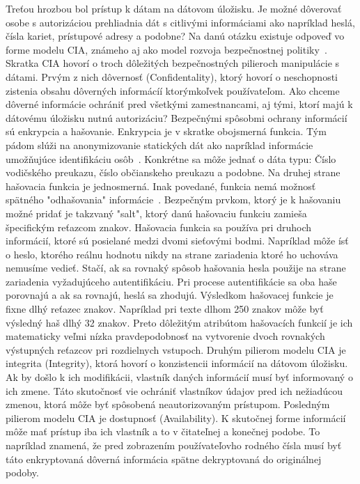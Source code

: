\par Treťou hrozbou bol prístup k dátam na dátovom úložisku. Je možné dôverovať osobe s autorizáciou prehliadnia dát s
citlivými informáciami ako napríklad heslá, čísla kariet, prístupové adresy a podobne? Na danú otázku existuje odpoveď
vo forme modelu CIA, známeho aj ako model rozvoja bezpečnostnej politiky~\cite{CIA}. Skratka CIA hovorí o troch dôležitých bezpečnostných
pilieroch manipulácie s dátami. Prvým z nich dôvernosť (Confidentality), ktorý hovorí o neschopnosti zistenia obsahu
dôverných informácíí ktorýmkoľvek používateľom. Ako chceme dôverné informácie ochrániť pred všetkými zamestnancami,
aj tými, ktorí majú k dátovému úložisku nutnú autorizáciu? Bezpečnými spôsobmi ochrany informácií sú enkrypcia a hašovanie.
Enkrypcia je v skratke obojsmerná funkcia. Tým pádom slúži na anonymizovanie statických dát ako napríklad informácie umožňujúce
identifikáciu osôb~\cite{Encryption}. Konkrétne sa môže jednať o dáta typu: Číslo vodičského preukazu, číslo občianskeho preukazu a podobne.
Na druhej strane hašovacia funkcia je jednosmerná. Inak povedané, funkcia nemá možnosť spätného "odhašovania" informácie~\cite{Hashing}.
Bezpečným prvkom, ktorý je k hašovaniu možné pridať je takzvaný "salt", ktorý danú hašovaciu funkciu zamieša špecifickým
reťazcom znakov. Hašovacia funkcia sa používa pri druhoch informácií, ktoré sú posielané medzi dvomi sieťovými bodmi. Napríklad
môže ísť o heslo, ktorého reálnu hodnotu nikdy na strane zariadenia ktoré ho uchováva nemusíme vedieť. Stačí, ak sa rovnaký
spôsob hašovania hesla použije na strane zariadenia vyžadujúceho autentifikáciu. Pri procese autentifikácie sa oba haše
porovnajú a ak sa rovnajú, heslá sa zhodujú. Výsledkom hašovacej funkcie je fixne dlhý reťazec znakov. Napríklad pri texte
dlhom 250 znakov môže byť výsledný haš dlhý 32 znakov. Preto dôležitým atribútom hašovacích funkcií je ich matematicky
veľmi nízka pravdepodobnosť na vytvorenie dvoch rovnakých výstupných reťazcov pri rozdielnych vstupoch. Druhým pilierom modelu
CIA je integrita (Integrity), ktorá hovorí o konzistencii informácií na dátovom úložisku. Ak by došlo k ich modifikácii, vlastník
daných informácií musí byť informovaný o ich zmene. Táto skutočnosť vie ochrániť vlastníkov údajov pred ich nežiadúcou
zmenou, ktorá môže byť spôsobená neautorizovaným prístupom. Posledným pilierom modelu CIA je dostupnosť (Availability).
K skutočnej forme informácií môže mať prístup iba ich vlastník a to v čitateľnej a konečnej podobe. To napríklad znamená,
že pred zobrazením používateľovho rodného čísla musí byť táto enkryptovaná dôverná informácia spätne dekryptovaná do
originálnej podoby.

